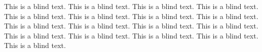 \documentclass{scrartcl}
\begin{document}
This is a blind text. This is a blind text. This is a blind text. This is a blind text. 
This is a blind text. This is a blind text. This is a blind text. 
This is a blind text. This is a blind text. 
This is a blind text. This is a blind text. This is a blind text. This is a blind text. 
This is a blind text. This is a blind text. This is a blind text. This is a blind text. 
\end{document}
